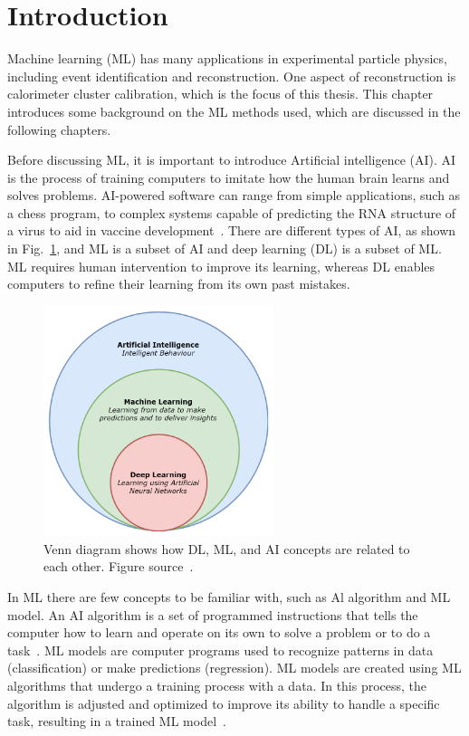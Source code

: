 \section{Introduction}
Machine learning (ML) has many applications in experimental particle physics, including event identification and reconstruction.
One aspect of reconstruction is calorimeter cluster calibration, which is the focus of this thesis.
This chapter introduces some background on the ML methods used, which are discussed in the following chapters.

Before discussing ML, it is important to introduce Artificial intelligence (AI).
AI is the process of training computers to imitate how the human brain learns and solves problems.
AI-powered software can range from simple applications, such as a chess program, to complex systems capable of predicting the RNA structure of a virus to aid in vaccine development~\cite{DL_ML_guide}.
There are different types of AI, as shown in Fig.~\ref{fig:ML_diagram}, and ML is a subset of AI and deep learning (DL) is a subset of ML.
ML requires human intervention to improve its learning, whereas DL enables computers to refine their learning from its own past mistakes.

\begin{figure}[t!]
\centering
\includegraphics[width=0.60\textwidth]{figures/ML_subsections.png}
\caption[Diagram of AI subsections]{Venn diagram shows how DL, ML, and AI concepts are related to each other. Figure source~\cite{ML_diagram}.}
\label{fig:ML_diagram}
\end{figure}

In ML there are few concepts to be familiar with, such as Al algorithm and ML model.
An AI algorithm is a set of programmed instructions that tells the computer how to learn and operate on its own to solve a problem or to do a task~\cite{AI_overview}.
ML models are computer programs used to recognize patterns in data (classification) or make predictions (regression).
ML models are created using ML algorithms that undergo a training process with a data.
In this process, the algorithm is adjusted and optimized to improve its ability to handle a specific task, resulting in a trained ML model~\cite{ML_models}.

